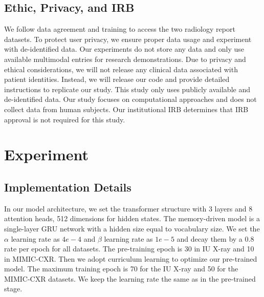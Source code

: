 \documentclass[sn-mathphys-num]{sn-jnl}%
\theoremstyle{thmstyleone}%
\theoremstyle{thmstyletwo}%
\theoremstyle{thmstylethree}%
\begin{document}
\begin{appendices}
\subsection{Ethic, Privacy, and IRB}

We follow data agreement and training to access the two radiology report datasets.
To protect user privacy, we ensure proper data usage and experiment with de-identified data. 
Our experiments do not store any data and only use available multimodal entries for research demonstrations.
Due to privacy and ethical considerations, we will not release any clinical data associated with patient identities. 
Instead, we will release our code and provide detailed instructions to replicate our study. 
This study only uses publicly available and de-identified data.
Our study focuses on computational approaches and does not collect data from human subjects.
Our institutional IRB determines that IRB approval is not required for this study.




\section{Experiment}



\subsection{Implementation Details}
\label{sec:implementation}
In our model architecture, we set the transformer structure with 3 layers and 8 attention heads, 512 dimensions for hidden states. The memory-driven model is a single-layer GRU network with a hidden size equal to vocabulary size. We set the $\alpha$ learning rate as $4e-4$ and $\beta$ learning rate as $1e-5$ and decay them by a 0.8 rate per epoch for all datasets. The pre-training epoch is 30 in IU X-ray and 10 in MIMIC-CXR. Then we adopt curriculum learning to optimize our pre-trained model. The maximum training epoch is 70 for the IU X-ray and 50 for the MIMIC-CXR datasets. We keep the learning rate the same as in the pre-trained stage. 


\end{appendices}
\end{document}
